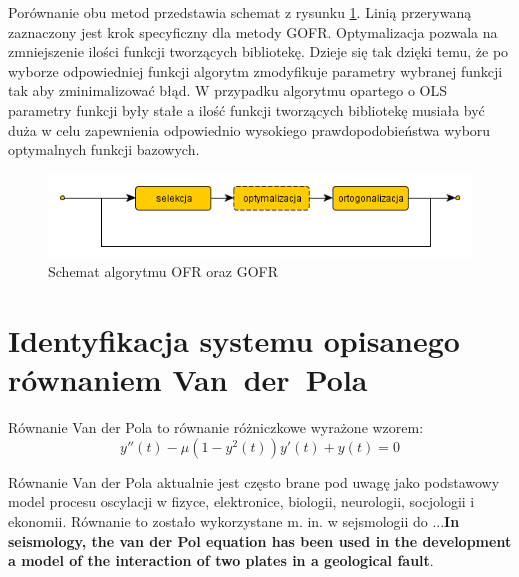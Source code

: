 Porównanie obu metod przedstawia schemat z rysunku \ref{ofr_and_gofr}. Linią przerywaną zaznaczony jest krok specyficzny dla metody GOFR. Optymalizacja pozwala na zmniejszenie ilości funkcji tworzących bibliotekę. Dzieje się tak dzięki temu, że po wyborze odpowiedniej funkcji algorytm zmodyfikuje parametry wybranej funkcji tak aby zminimalizować błąd. W przypadku algorytmu opartego o OLS parametry funkcji były stałe a ilość funkcji tworzących bibliotekę musiała być duża w celu zapewnienia odpowiednio wysokiego prawdopodobieństwa wyboru optymalnych funkcji bazowych.

\begin{figure}[ht!]
	\centering
	
	\includegraphics[scale=0.7]{images/ofr_and_gofr.png}
	\caption{Schemat algorytmu OFR oraz GOFR}
	\label{ofr_and_gofr}	

\end{figure}

\clearpage
\section{Identyfikacja systemu opisanego równaniem \mbox{Van der Pola}}

Równanie Van der Pola to równanie różniczkowe wyrażone wzorem:
\begin{equation}
	\label{wzor:van_der_pol}
	y''(t) - \mu(1 - y^2(t))y'(t) + y(t) = 0
\end{equation}

Równanie Van der Pola aktualnie jest często brane pod uwagę jako podstawowy model procesu oscylacji w fizyce, elektronice, biologii, neurologii, socjologii i ekonomii. Równanie to zostało wykorzystane m. in. w sejsmologii do ...\textbf{In seismology, the van der Pol equation has been used in the development a model of the interaction of two plates in a geological fault}\cite{Tsatsos}.

